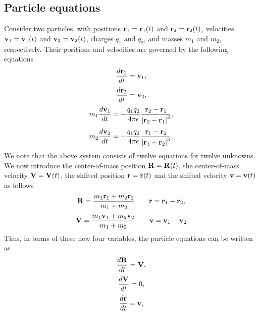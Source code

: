 \documentclass[a4paper,11pt]{report}
\begin{document}
\subsection{Particle equations}
\label{sec:coulomb_particle_equations}
Consider two particles, with positions $\mathbf{r}_1=\mathbf{r}_1(t)$ and $\mathbf{r}_2=\mathbf{r}_2(t)$, velocities $\mathbf{v}_1=\mathbf{v}_1(t)$ and $\mathbf{v}_2=\mathbf{v}_2(t)$, charges $q_1$ and $q_2$, and masses $m_1$ and $m_2$, respectively. Their positions and velocities are governed by the following equations 
\begin{equation}
    \label{eq:coul_particle_1_pos}
    \frac{d \mathbf{r}_1}{dt} = \mathbf{v}_1,
\end{equation}
\begin{equation}
    \label{eq:coul_particle_2_pos}
    \frac{d \mathbf{r}_2}{dt} = \mathbf{v}_2,
\end{equation}
\begin{equation}
    \label{eq:coul_particle_1_vel}
    m_1 \frac{d\mathbf{v}_1}{dt} = -\frac{q_1 q_2}{4 \pi \epsilon} \frac{\mathbf{r}_2 - \mathbf{r}_1}{\left | \mathbf{r}_2 - \mathbf{r}_1 \right |^3},
\end{equation}
\begin{equation}
    \label{eq:coul_particle_2_vel}
    m_2 \frac{d\mathbf{v}_2}{dt} = -\frac{q_1 q_2}{4 \pi \epsilon} \frac{\mathbf{r}_1 - \mathbf{r}_2}{\left | \mathbf{r}_1 - \mathbf{r}_2 \right |^3}.
\end{equation}
We note that the above system consists of twelve equations for twelve unknowns. We now introduce the center-of-mass position $\mathbf{R} = \mathbf{R}(t)$, the center-of-mass velocity $\mathbf{V} = \mathbf{V}(t)$, the shifted position $\mathbf{r} = \mathbf{r}(t)$ and the shifted velocity $\mathbf{v} = \mathbf{v}(t)$ as follows
\begin{equation*}
    \mathbf{R} = \frac{m_1 \mathbf{r}_1 + m_2 \mathbf{r}_2}{m_1 + m_2} \qquad \mathbf{r} = \mathbf{r}_1 - \mathbf{r}_2,
\end{equation*}
\begin{equation*}
    \mathbf{V} = \frac{m_1 \mathbf{v}_1 + m_2 \mathbf{v}_2}{m_1 + m_2} \qquad \mathbf{v} = \mathbf{v}_1 - \mathbf{v}_2
\end{equation*}
Thus, in terms of these new four variables, the particle equations can be written as
\begin{equation}
    \frac{d \mathbf{R}}{dt} = \mathbf{V},
\end{equation}
\begin{equation}
    \frac{d \mathbf{V}}{dt} = 0 ,
\end{equation}
\begin{equation}
    \label{eq:particle_pos}
    \frac{d \mathbf{r}}{dt} = \mathbf{v},
\end{equation}
\end{document}
